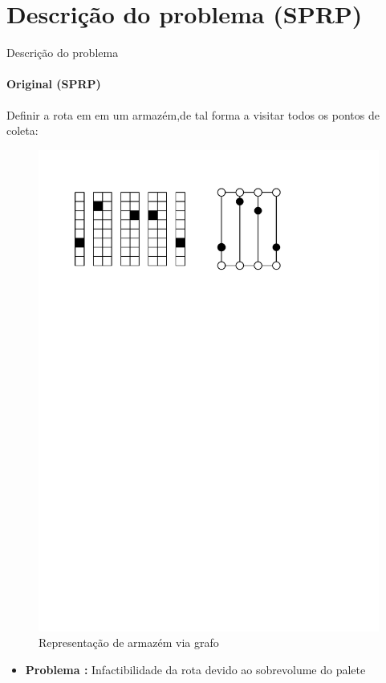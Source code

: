 \documentclass[12pt]{beamer}
\begin{document}
\section{Descri\c{c}\~ao do problema (SPRP)}
	\begin{frame}{Descri\c{c}\~ao do problema}
	\framesubtitle{Original (SPRP)}	
		Definir a rota em em um armaz\'em,de tal forma a visitar todos os pontos de coleta:
			\begin{figure}
			\pause
			\includegraphics[width=1\linewidth]{CD_1}
			\caption{Representa\c{c}\~ao de armaz\'em via grafo}
			
		\end{figure}
	\pause
	\begin{itemize}
		\item {\bfseries Problema :}
		Infactibilidade da rota devido ao sobrevolume do palete
	\end{itemize}
	\end{frame}
\end{document}
